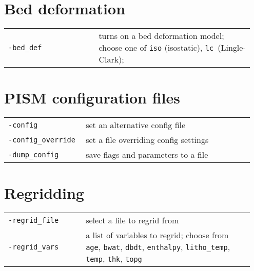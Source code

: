 \documentclass[landscape]{article}
\begin{document}
\begin{textblock}{15}
\section{Bed deformation}
\label{sec:bed-deformation}
\begin{tabular}{@{}p{0.35\linewidth}p{0.6\linewidth}@{}}
  \texttt{-bed_def} & turns on a bed deformation model; choose one of \texttt{iso} (isostatic), \texttt{lc}~(Lingle-Clark);\\
\end{tabular}

\section{PISM configuration files}
\label{sec:pism-config-file}
\begin{tabular}{@{}p{0.3\linewidth}p{0.65\linewidth}@{}}
\texttt{-config} & set an alternative config file\\
\texttt{-config_override} & set a file overriding config
settings\\
\texttt{-dump_config} & save flags and parameters to a file
\end{tabular}

\section{Regridding}
\label{sec:regridding}
\begin{tabular}{@{}p{0.3\linewidth}p{0.65\linewidth}@{}}
  \texttt{-regrid_file} & select a file to regrid from\\
  \texttt{-regrid_vars} & a list of variables to regrid; choose from
  \texttt{age}, \texttt{bwat}, \texttt{dbdt}, \texttt{enthalpy}, \texttt{litho_temp}, \texttt{temp},
  \texttt{thk}, \texttt{topg}\\
\end{tabular}


\end{textblock}
\end{document}
